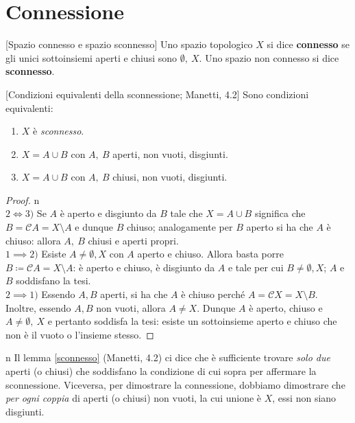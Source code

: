 \section{Connessione}
\begin{definition}{}[Spazio connesso e spazio sconnesso]
Uno spazio topologico $X$ si dice \textbf{connesso} se gli unici sottoinsiemi aperti e chiusi sono $\emptyset,\ X$. Uno spazio non connesso si dice \textbf{sconnesso}.
\end{definition}
\begin{lemma}{}[Condizioni equivalenti della sconnessione; Manetti, 4.2]\label{sconnesso}
Sono condizioni equivalenti:
\begin{enumerate}
	\item $X$ è \textit{sconnesso}.
	\item $X=A\cup B$ con $A,\ B$ aperti, non vuoti, disgiunti.
	\item $X=A\cup B$ con $A,\ B$ chiusi, non vuoti, disgiunti.
\end{enumerate}
\end{lemma}
\begin{proof}{n}~{}\\
$2\iff3)$ Se $A$ è aperto e disgiunto da $B$ tale che $X=A\cup B$ significa che $B=\mathcal{C}A=X\setminus A$ e dunque $B$ chiuso; analogamente per $B$ aperto si ha che $A$ è chiuso: allora $A,\ B$ chiusi e aperti propri.\\
$1\implies2)$ Esiste $A\neq \emptyset, X$ con $A$ aperto e chiuso. Allora basta porre $B\coloneqq\mathcal{C}A=X\setminus A$: è aperto e chiuso, è disgiunto da $A$ e tale per cui $B\neq \emptyset, X$; $A$ e $B$ soddisfano la tesi.\\
$2\implies1)$ Essendo $A, B$ aperti, si ha che $A$ è chiuso perché $A=\mathcal{C}X=X\setminus B$. Inoltre, essendo $A,B$ non vuoti, allora $A\neq X$. Dunque $A$ è aperto, chiuso e $A\neq \emptyset,\ X$ e pertanto soddisfa la tesi: esiste un sottoinsieme aperto e chiuso che non è il vuoto o l'insieme stesso.\qedhere
\end{proof}
\begin{tipsandtricks}{n}
	Il lemma \ref{sconnesso} (Manetti, 4.2) ci dice che è sufficiente trovare \textit{solo due} aperti (o chiusi) che soddisfano la condizione di cui sopra per affermare la sconnessione. Viceversa, per dimostrare la connessione, dobbiamo dimostrare che \textit{per ogni coppia} di aperti (o chiusi) non vuoti, la cui unione è $X$, essi non siano disgiunti.
\end{tipsandtricks}
